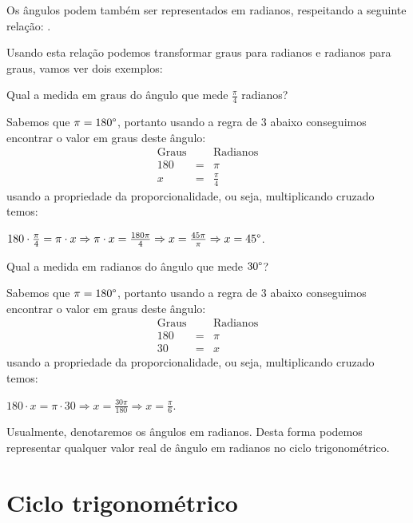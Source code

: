 
 Os ângulos podem também ser representados em radianos, respeitando a seguinte relação:
  .

  Usando esta relação podemos transformar graus para radianos e radianos para graus, vamos ver dois exemplos:

  \begin{exem}
   Qual a medida em graus do ângulo que mede $\frac{\pi}{4}$ radianos?

   Sabemos que $\pi= 180\degree$, portanto usando a regra de 3 abaixo conseguimos encontrar o valor em graus deste ângulo:
   \begin{eqnarray*}
  \text{Graus} & & \text{Radianos} \\
   180 & = & \pi\\
  x & = & \frac{\pi}{4}
 \end{eqnarray*}
 usando a propriedade da proporcionalidade, ou seja, multiplicando cruzado temos:

 $180 \cdot \frac{\pi}{4}= \pi \cdot x \Rightarrow \pi \cdot x= \frac{180 \pi}{4} \Rightarrow x= \frac{45 \pi}{\pi} \Rightarrow x= 45\degree$.

 \fim
  \end{exem}

  \begin{exem}
   Qual a medida em radianos do ângulo que mede $30\degree$?

   Sabemos que $\pi= 180\degree$, portanto usando a regra de 3 abaixo conseguimos encontrar o valor em graus deste ângulo:
   \begin{eqnarray*}
  \text{Graus} & & \text{Radianos} \\
   180 & = & \pi\\
  30 & = & x
 \end{eqnarray*}
 usando a propriedade da proporcionalidade, ou seja, multiplicando cruzado temos:

 $180 \cdot x= \pi \cdot 30 \Rightarrow x= \frac{30 \pi}{180} \Rightarrow x= \frac{\pi}{6}$.

 \fim
  \end{exem}

Usualmente, denotaremos os ângulos em radianos. Desta forma podemos representar qualquer valor real de ângulo em radianos no ciclo trigonométrico.

\section{Ciclo trigonométrico}


